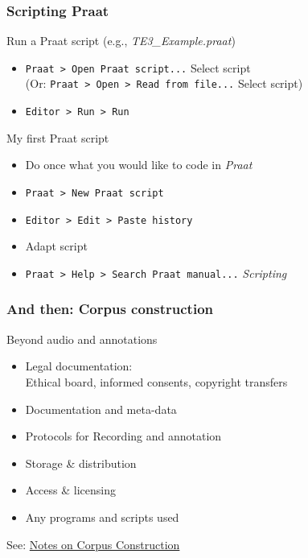 \documentclass{beamer}
\begin{document}
\begin{frame} 
\frametitle{Scripting Praat} 
\begin{block}{Run a Praat script (e.g., \textit{TE3\_Example.praat})}
\begin{itemize} 
\item \texttt{Praat > Open Praat script...} Select script \\
      (Or: \texttt{Praat > Open > Read from file...} Select script)
\item \texttt{Editor > Run > Run}
\end{itemize}
\end{block} 

\begin{block}{My first Praat script}
\begin{itemize} 
\item Do once what you would like to code in \textit{Praat}
\item \texttt{Praat > New Praat script}
\item \texttt{Editor > Edit > Paste history}
\item Adapt script
\item \texttt{Praat > Help > Search Praat manual...} \textit{Scripting}
\end{itemize}
\end{block} 
\end{frame}

\begin{frame} 
\frametitle{And then: Corpus construction} 
\begin{block}{Beyond audio and annotations}
\begin{itemize} 
\item Legal documentation:\\ Ethical board, informed consents, copyright transfers
\item Documentation and meta-data
\item Protocols for Recording and annotation
\item Storage \& distribution
\item Access \& licensing
\item Any programs and scripts used
\end{itemize}
\end{block} 
\vskip 1cm
See: \href{http://www.fon.hum.uva.nl/rob/NotesOnCorpora/NotesOnCorpusConstruction.pdf}{Notes on Corpus Construction}
\end{frame}
\end{document}
